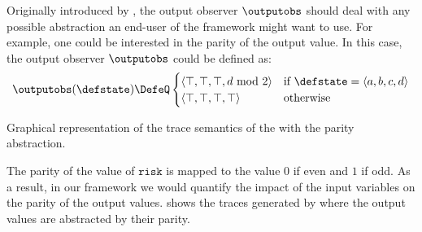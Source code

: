 \begin{example}
  Originally introduced by , the output observer $\outputobs$ should deal with any possible abstraction an end-user of the framework might want to use.
  For example, one could be interested in the parity of the output value.
  In this case, the output observer $\outputobs$ could be defined as:
  \[
  \outputobs(\defstate) \DefeQ \begin{cases}
    \langle \top, \top, \top, d \!\!\mod 2 \rangle & \text{if } \defstate = \langle a, b, c, d \rangle \\
    \langle \top, \top, \top, \top \rangle & \text{otherwise}
  \end{cases}
  \]
  \begin{marginfigure}
    \centering
  \caption{Graphical representation of the trace semantics of the  with the parity abstraction.}
  \end{marginfigure}
  The parity of the value of $\texttt{risk}$ is mapped to the value $0$ if even and $1$ if odd.
  As a result, in our framework we would quantify the impact of the input variables on the parity of the output values.
   shows the traces generated by  where the output values are abstracted by their parity.
\end{example}



